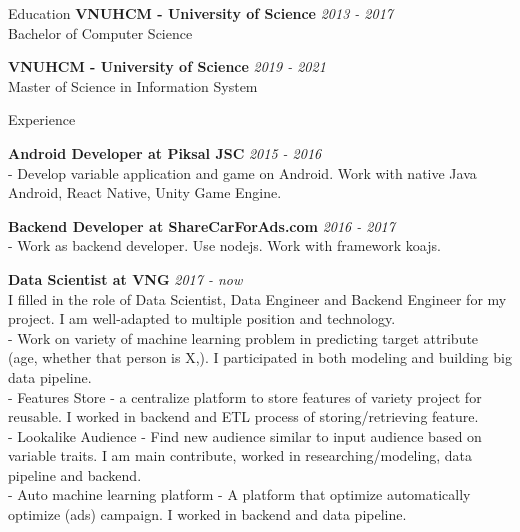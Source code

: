 \documentclass{resume} %
\begin{document}

\begin{rSection}{Education}
{\bf VNUHCM - University of Science} \hfill {\em 2013 - 2017 } 
\\ Bachelor of Computer Science %

{\bf VNUHCM - University of Science} \hfill {\em 2019 - 2021 } 
\\ Master of Science in Information System %


\end{rSection}
\begin{rSection}{Experience}

{\bf Android Developer at Piksal JSC} \hfill {\em 2015 - 2016}\\
- Develop variable application and game on Android. Work with native Java Android, React Native, Unity Game Engine. 

{\bf Backend Developer at ShareCarForAds.com} \hfill {\em 2016 - 2017}\\
- Work as backend developer. Use nodejs. Work with framework koajs.

{\bf Data Scientist at VNG } \hfill {\em 2017 - now}\\
I filled in the role of Data Scientist, Data Engineer and Backend Engineer for my project. I am well-adapted to multiple position and technology.
\\ - Work on variety of machine learning problem in predicting target attribute (age, whether that person is X,). I participated in both modeling and building big data pipeline. 
\\ - Features Store - a centralize platform to store features of variety project for reusable. I worked in backend and ETL process of storing/retrieving feature. 
\\ - Lookalike Audience - Find new audience similar to input audience based on variable traits. I am main contribute, worked in researching/modeling, data pipeline and backend. 
\\ - Auto machine learning platform - A platform that optimize automatically optimize (ads) campaign.  I worked in backend and data pipeline.

\end{rSection}
\end{document}
